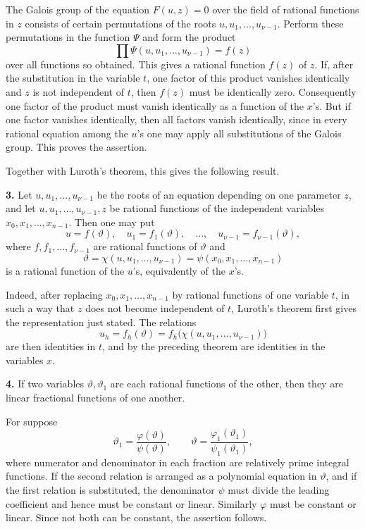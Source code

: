 \documentclass[11pt,a4paper]{book}
\begin{document}
The Galois group of the equation $F(u,z)=0$ over the field of rational functions in $z$ consists of certain permutations of the roots $u,u_1,
\ldots,u_{\nu-1}$.  Perform these permutations in the function $\Psi$ and form the product
\begin{equation}
 \prod \Psi(u,u_1,\ldots,u_{\nu-1})=f(z)
\end{equation}
over all functions so obtained.  This gives a rational function $f(z)$ of $z$.  If, after the substitution in the variable $t$, one factor of this product vanishes identically and $z$ is not independent of $t$, then $f(z)$ must be identically zero.  Consequently one factor of the product must vanish identically as a function of the $x$'s.  But if one factor vanishes identically, then all factors vanish identically, since in every rational equation among the $u$'s one may apply all substitutions of the Galois group.  This proves the assertion.

Together with Luroth's theorem, this gives the following result.

\textbf{3.} Let $u,u_1,
\ldots,u_{\nu-1}$ be the roots of an equation depending on one parameter $z$, and let $u,u_1,
\ldots,u_{\nu-1},z$ be rational functions of the independent variables $x_0,x_1,
\ldots,x_{n-1}$.  Then one may put
\begin{equation}
 u=f(\vartheta),\quad u_1=f_1(\vartheta),\quad\ldots,\quad
 u_{\nu-1}=f_{\nu-1}(\vartheta),
\end{equation}
where $f,f_1,
\ldots,f_{\nu-1}$ are rational functions of $\vartheta$ and
\begin{equation}
 \vartheta=\chi(u,u_1,
\ldots,u_{\nu-1})=\psi(x_0,x_1,
\ldots,x_{n-1})
\end{equation}
is a rational function of the $u$'s, equivalently of the $x$'s.

Indeed, after replacing $x_0,x_1,
\ldots,x_{n-1}$ by rational functions of one variable $t$, in such a way that $z$ does not become independent of $t$, Luroth's theorem first gives the representation just stated.  The relations
\[
 u_h=f_h(\vartheta)=f_h\bigl(\chi(u,u_1,
\ldots,u_{\nu-1})\bigr)
\]
are then identities in $t$, and by the preceding theorem are identities in the variables $x$.

\textbf{4.} If two variables $\vartheta,\vartheta_1$ are each rational functions of the other, then they are linear fractional functions of one another.

For suppose
\[
 \vartheta_1=\frac{\varphi(\vartheta)}{\psi(\vartheta)},
 \qquad
 \vartheta=\frac{\varphi_1(\vartheta_1)}{\psi_1(\vartheta_1)},
\]
where numerator and denominator in each fraction are relatively prime integral functions.  If the second relation is arranged as a polynomial equation in $\vartheta$, and if the first relation is substituted, the denominator $\psi$ must divide the leading coefficient and hence must be constant or linear.  Similarly $\varphi$ must be constant or linear.  Since not both can be constant, the assertion follows.
\end{document}
